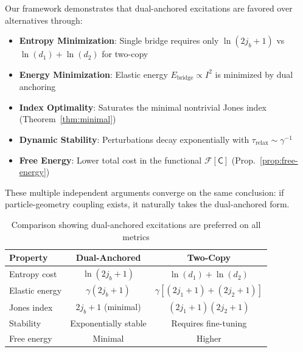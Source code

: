 \documentclass[11pt]{article}
\theoremstyle{plain}
\theoremstyle{definition}
\begin{document}
\begin{tcolorbox}[title=Why Dual-Anchored Excitations are Physically Preferred]
  Our framework demonstrates that dual-anchored excitations are favored over alternatives through:
  \begin{itemize}
    \item \textbf{Entropy Minimization}: Single bridge requires only $\ln(2j_b+1)$ vs $\ln(d_1) + \ln(d_2)$ for two-copy
    \item \textbf{Energy Minimization}: Elastic energy $E_{\text{bridge}} \propto I^2$ is minimized by dual anchoring
    \item \textbf{Index Optimality}: Saturates the minimal nontrivial Jones index (Theorem~\ref{thm:minimal})
    \item \textbf{Dynamic Stability}: Perturbations decay exponentially with $\tau_{\text{relax}} \sim \gamma^{-1}$
    \item \textbf{Free Energy}: Lower total cost in the functional $\mathcal{F}[\mathsf{C}]$ (Prop.~\ref{prop:free-energy})
  \end{itemize}
  These multiple independent arguments converge on the same conclusion: if particle-geometry coupling exists, it naturally takes the dual-anchored form.
\end{tcolorbox}

\begin{table}[h]
  \centering
  \begin{tabular}{lcc}
    \hline
    \textbf{Property} & \textbf{Dual-Anchored} & \textbf{Two-Copy} \\
    \hline
    Entropy cost & $\ln(2j_b+1)$ & $\ln(d_1) + \ln(d_2)$ \\
    Elastic energy & $\gamma (2j_b+1)$ & $\gamma[(2j_1+1) + (2j_2+1)]$ \\
    Jones index & $2j_b+1$ (minimal) & $(2j_1+1)(2j_2+1)$ \\
    Stability & Exponentially stable & Requires fine-tuning \\
    Free energy & Minimal & Higher \\
    \hline
  \end{tabular}
  \caption{Comparison showing dual-anchored excitations are preferred on all metrics}
\end{table}
\end{document}
